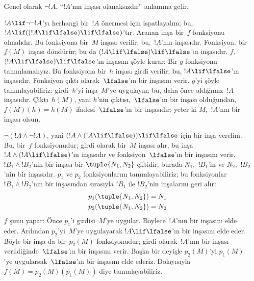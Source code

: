 Genel olarak $\lnot !A$, ``$!A$'nın inşası olanaksızdır'' anlamına gelir.

\begin{ex}
$!A \lif \lnot \lnot !A$'yı herhangi bir~$!A$ önermesi için ispatlayalım;
bu, $!A \lif ((!A \lif \lfalse) \lif \lfalse)$'tır. Aranan inşa bir~$f$
fonksiyonu olmalıdır. Bu fonksiyona bir~$M$ inşası verilir; bu,~$!A$'nın
inşasıdır. Fonksiyon, bir~$f(M)$ inşası döndürür; bu da $(!A \lif \lfalse)
\lif \lfalse$'ın inşasıdır. $f$, $(!A \lif \lfalse) \lif \lfalse$'ın
inşasını şöyle kurar: Bir $g$ fonksiyonu tanımlamalıyız. Bu fonksiyona bir~$h$
inşası girdi verilir; bu, $!A \lif \lfalse$'ın inşasıdır. Fonksiyon çıktı
olarak~$\lfalse$'ın bir inşasını verir. $g$'yi şöyle tanımlayabiliriz:
girdi~$h$'yi inşa~$M$'ye uygulayın; bu, daha önce aldığımız~$!A$ inşasıdır.
Çıktı~$h(M)$, yani $h$'nin çıktısı,~$\lfalse$'ın bir inşası olduğundan,
$f(M)(h) = h(M)$ ifadesi~$\lfalse$'ın bir inşasıdır; yeter ki $M$,~$!A$'nın
bir inşası olsun.
\end{ex}

\begin{ex}
$\lnot(!A \land \lnot !A)$, yani $(!A \land (!A \lif \lfalse)) \lif
\lfalse$ için bir inşa verelim. Bu, bir~$f$ fonksiyonudur; girdi olarak
bir~$M$ inşası alır, bu inşa $!A \land (!A \lif \lfalse)$'ın inşasıdır ve
fonksiyon~$\lfalse$'ın bir inşasını verir. $!B_1 \land !B_2$'nin bir inşası
bir $\tuple{N_1, N_2}$ çiftidir; burada $N_1$,~$!B_1$'in ve $N_2$,~$!B_2$'nin
bir inşasıdır. $p_1$ ve $p_2$ fonksiyonlarını tanımlayabiliriz; bu fonksiyonlar
$!B_1 \land !B_2$'nin bir inşasından sırasıyla $!B_1$ ile $!B_2$'nin
inşalarını geri alır:
\begin{align*}
  p_1(\tuple{N_1, N_2}) &= N_1\\
  p_2(\tuple{N_1, N_2}) &= N_2
\end{align*}
$f$ şunu yapar: Önce $p_1$'i girdisi~$M$'ye uygular. Böylece~$!A$'nın bir
inşasını elde eder. Ardından $p_2$'yi~$M$'ye uygulayarak $!A \lif \lfalse$'ın
bir inşasını elde eder. Böyle bir inşa da bir~$p_2(M)$ fonksiyonudur; girdi
olarak~$!A$'nın bir inşası verildiğinde~$\lfalse$'ın bir inşasını verir. Başka
bir deyişle $p_2(M)$'yi $p_1(M)$'ye uygularsak~$\lfalse$'ın bir inşasını elde
ederiz. Dolayısıyla $f(M) = p_2(M)(p_1(M))$ diye tanımlayabiliriz.
\end{ex}

